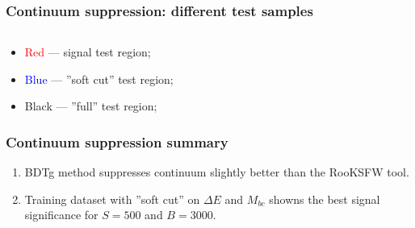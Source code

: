\documentclass[10 pt,compress,mathserif]{beamer}
\begin{document}
\begin{frame}
 \frametitle{Continuum suppression: different test samples}
 \begin{small}
 \begin{columns}
  \begin{column}{0.5\textwidth}
  \begin{center}
  \end{center}
  \end{column}
  \begin{column}{0.5\textwidth}
  \begin{center}
   \end{center}
  \end{column}
 \end{columns}

 \begin{itemize}
  \item \textcolor{red}{Red} --- signal test region;
  \item \textcolor{blue}{Blue} --- ''soft cut'' test region;
  \item Black --- ''full'' test region;
 \end{itemize}
\end{small}
\end{frame}

% 

\begin{frame}
 \frametitle{Continuum suppression summary}
 \begin{enumerate}
  \item BDTg method suppresses continuum slightly better than the RooKSFW tool.
  \item Training dataset with ''soft cut'' on $\Delta E$ and $M_{bc}$ showns the best signal significance for $S=500$ and $B=3000$.
 \end{enumerate}
\end{frame}
\end{document}
